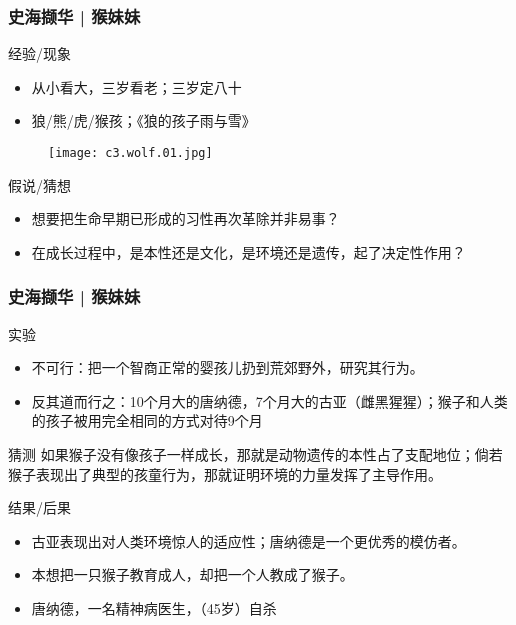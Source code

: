 \begin{frame}
  \frametitle{史海撷华 | 猴妹妹}
  \begin{block}{经验/现象}
    \begin{itemize}
      \item 从小看大，三岁看老；三岁定八十
      \item 狼/熊/虎/猴孩；《狼的孩子雨与雪》
    \end{itemize}
    \vspace{-1.5em}
    \begin{figure}
      \centering
      \texttt{[image: c3.wolf.01.jpg]}
    \end{figure}
  \end{block}
  \pause
  \begin{block}{假说/猜想}
    \begin{itemize}
      \item 想要把生命早期已形成的习性再次革除并非易事？
      \item 在成长过程中，是本性还是文化，是环境还是遗传，起了决定性作用？
    \end{itemize}
  \end{block}
\end{frame}

\begin{frame}
  \frametitle{史海撷华 | 猴妹妹}
  \begin{block}{实验}
    \begin{itemize}
      \item 不可行：把一个智商正常的婴孩儿扔到荒郊野外，研究其行为。
      \item 反其道而行之：10个月大的唐纳德，7个月大的古亚（雌黑猩猩）；猴子和人类的孩子被用完全相同的方式对待9个月
    \end{itemize}
  \end{block}
  \vspace{-0.5em}
  \pause
  \begin{block}{猜测}
    如果猴子没有像孩子一样成长，那就是动物遗传的本性占了支配地位；倘若猴子表现出了典型的孩童行为，那就证明环境的力量发挥了主导作用。
  \end{block}
  \vspace{-0.5em}
  \pause
  \begin{block}{结果/后果}
    \begin{itemize}
      \item 古亚表现出对人类环境惊人的适应性；唐纳德是一个更优秀的模仿者。
      \item 本想把一只猴子教育成人，却把一个人教成了猴子。
      \item 唐纳德，一名精神病医生，（45岁）自杀
    \end{itemize}
  \end{block}
\end{frame}

